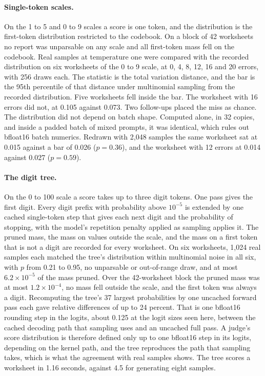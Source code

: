 \documentclass{article}
\theoremstyle{definition}
\theoremstyle{remark}
\begin{document}
\paragraph{Single-token scales.}
On the 1 to 5 and 0 to 9 scales a score is one token, and the distribution is the first-token distribution restricted to the codebook.
On a block of 42 worksheets no report was unparsable on any scale and all first-token mass fell on the codebook.
Real samples at temperature one were compared with the recorded distribution on six worksheets of the 0 to 9 scale, at 0, 4, 8, 12, 16 and 20 errors, with 256 draws each.
The statistic is the total variation distance, and the bar is the 95th percentile of that distance under multinomial sampling from the recorded distribution.
Five worksheets fell inside the bar.
The worksheet with 16 errors did not, at 0.105 against 0.073.
Two follow-ups placed the miss as chance.
The distribution did not depend on batch shape. Computed alone, in 32 copies, and inside a padded batch of mixed prompts, it was identical, which rules out bfloat16 batch numerics.
Redrawn with 2{,}048 samples the same worksheet sat at 0.015 against a bar of 0.026 ($p=0.36$), and the worksheet with 12 errors at 0.014 against 0.027 ($p=0.59$).

\paragraph{The digit tree.}
On the 0 to 100 scale a score takes up to three digit tokens.
One pass gives the first digit.
Every digit prefix with probability above $10^{-5}$ is extended by one cached single-token step that gives each next digit and the probability of stopping, with the model's repetition penalty applied as sampling applies it.
The pruned mass, the mass on values outside the scale, and the mass on a first token that is not a digit are recorded for every worksheet.
On six worksheets, 1{,}024 real samples each matched the tree's distribution within multinomial noise in all six, with $p$ from 0.21 to 0.95, no unparsable or out-of-range draw, and at most $6.2\times10^{-5}$ of the mass pruned.
Over the 42-worksheet block the pruned mass was at most $1.2\times10^{-4}$, no mass fell outside the scale, and the first token was always a digit.
Recomputing the tree's 37 largest probabilities by one uncached forward pass each gave relative differences of up to 24 percent.
That is one bfloat16 rounding step in the logits, about 0.125 at the logit sizes seen here, between the cached decoding path that sampling uses and an uncached full pass.
A judge's score distribution is therefore defined only up to one bfloat16 step in its logits, depending on the kernel path, and the tree reproduces the path that sampling takes, which is what the agreement with real samples shows.
The tree scores a worksheet in 1.16 seconds, against 4.5 for generating eight samples.
\end{document}
